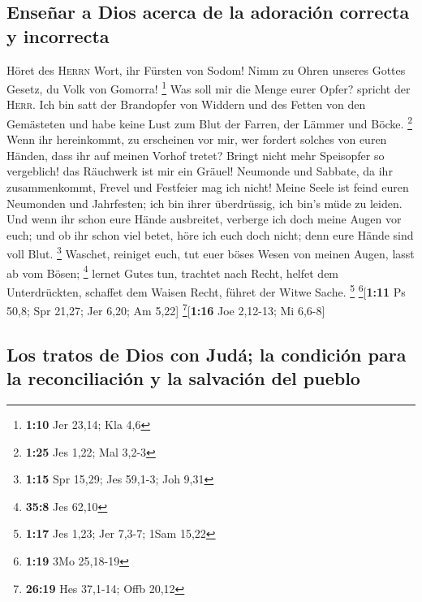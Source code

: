 \hypertarget{enseuxf1ar-a-dios-acerca-de-la-adoraciuxf3n-correcta-y-incorrecta}{%
\subsection{Enseñar a Dios acerca de la adoración correcta y
incorrecta}\label{enseuxf1ar-a-dios-acerca-de-la-adoraciuxf3n-correcta-y-incorrecta}}

 Höret des \textsc{Herrn} Wort, ihr Fürsten von Sodom!
Nimm zu Ohren unseres Gottes Gesetz, du Volk von Gomorra! \footnote{\textbf{1:10}
  Jer 23,14; Kla 4,6}  Was soll mir die Menge eurer
Opfer? spricht der \textsc{Herr}. Ich bin satt der Brandopfer von
Widdern und des Fetten von den Gemästeten und habe keine Lust zum Blut
der Farren, der Lämmer und Böcke. \footnote{\textbf{1:25} Jes 1,22; Mal
  3,2-3}  Wenn ihr hereinkommt, zu erscheinen vor mir,
wer fordert solches von euren Händen, dass ihr auf meinen Vorhof tretet?
 Bringt nicht mehr Speisopfer so vergeblich! das
Räuchwerk ist mir ein Gräuel! Neumonde und Sabbate, da ihr
zusammenkommt, Frevel und Festfeier mag ich nicht!  Meine
Seele ist feind euren Neumonden und Jahrfesten; ich bin ihrer
überdrüssig, ich bin's müde zu leiden.  Und wenn ihr
schon eure Hände ausbreitet, verberge ich doch meine Augen vor euch; und
ob ihr schon viel betet, höre ich euch doch nicht; denn eure Hände sind
voll Blut. \footnote{\textbf{1:15} Spr 15,29; Jes 59,1-3; Joh 9,31}
 Waschet, reiniget euch, tut euer böses Wesen von meinen
Augen, lasst ab vom Bösen; \footnote{\textbf{35:8} Jes 62,10}
 lernet Gutes tun, trachtet nach Recht, helfet dem
Unterdrückten, schaffet dem Waisen Recht, führet der Witwe Sache.
\footnote{\textbf{1:17} Jes 1,23; Jer 7,3-7; 1Sam 15,22}
\footnote{\textbf{1:19} 3Mo 25,18-19}{[}\textbf{1:11} Ps 50,8; Spr
21,27; Jer 6,20; Am 5,22{]} \footnote{\textbf{26:19} Hes 37,1-14; Offb
  20,12}{[}\textbf{1:16} Joe 2,12-13; Mi 6,6-8{]}

\hypertarget{los-tratos-de-dios-con-juduxe1-la-condiciuxf3n-para-la-reconciliaciuxf3n-y-la-salvaciuxf3n-del-pueblo}{%
\subsection{Los tratos de Dios con Judá; la condición para la
reconciliación y la salvación del
pueblo}\label{los-tratos-de-dios-con-juduxe1-la-condiciuxf3n-para-la-reconciliaciuxf3n-y-la-salvaciuxf3n-del-pueblo}}

